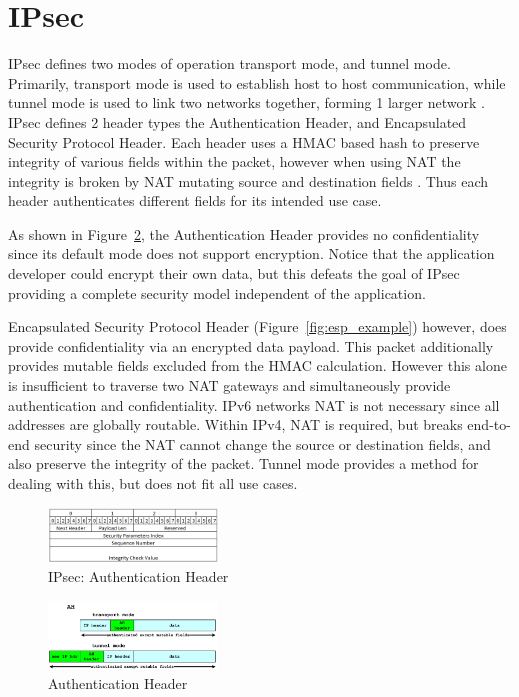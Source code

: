 \documentclass[conference,12pt]{IEEEtran}
\begin{document}
\section{IPsec}
IPsec defines two modes of operation transport mode, and tunnel mode. Primarily,
transport mode is used to establish host to host communication, while tunnel
mode is used to link two networks together, forming 1 larger network \autocite{cisco_ipsec}. IPsec 
defines 2 header types the Authentication Header, and Encapsulated Security
Protocol Header. Each header uses a HMAC based hash to preserve integrity of
various fields within the packet, however when using NAT the integrity is broken 
by NAT mutating source and destination fields \autocite{rfc3022}. Thus each header
authenticates different fields for its intended use case. 

As shown in Figure~\ref{fig:ah_example}, the Authentication Header provides no
confidentiality since its default mode does not support encryption.  Notice
that the application developer could encrypt their own data, but this defeats
the goal of IPsec providing a complete security model independent of the
application. 

Encapsulated Security Protocol Header (Figure~\ref{fig:esp_example}) however, does
provide confidentiality via an encrypted data payload. This packet
additionally provides mutable fields excluded from the HMAC calculation. However
this alone is insufficient to traverse two NAT gateways and simultaneously provide
authentication and confidentiality. IPv6
networks NAT is not necessary since all addresses are globally routable.
Within IPv4, NAT is required, but breaks end-to-end security since the
NAT cannot change the source or destination fields, and also preserve the integrity
of the packet. Tunnel mode provides a method for dealing with this, but does not
fit all use cases. 

\begin{figure}
\centering
\includegraphics[width=0.4\textwidth]{AH.png}
\caption{IPsec: Authentication Header}
\label{fig:ah}
\end{figure}

\begin{figure}
\centering
\includegraphics[width=0.4\textwidth]{AH_example.PNG}
\caption{Authentication Header \autocite{ipsec_example}}
\label{fig:ah_example}
\end{figure}
\end{document}
